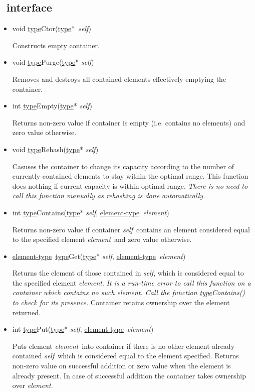 \documentclass[a4paper]{article}
\newcommand{\st}{\underline{type}}
\newcommand{\et}{\underline{element-type}}
\newcommand{\sv}{\emph{self}}
\newcommand{\ev}{\emph{element}}
\newcommand{\meth}[1]{#1}
\begin{document}
\subsection{\Hashset\ interface}


\begin{itemize}


\item \meth{void \st Ctor(\st*\ \sv)}


Constructs empty container.


\commonmethods


\item \meth{void \st Purge}(\st* \sv)


Removes and destroys all contained elements effectively emptying the container.


\item \meth{int \st Empty}(\st* \sv)


Returns non-zero value if container is empty (i.e. contains no elements) and zero value otherwise.


\item \meth{void \st Rehash(\st* \sv)}


Casuses the container to change its capacity according to the number of currently contained elements to stay within the optimal range.
This function does nothing if current capacity is within optimal range.
\emph{There is no need to call this function manually as rehashing is done automatically.}


\item \meth{int \st Contains(\st* \sv, \et\ \ev)}


Returns non-zero value if container \sv\ contains an element considered equal to the specified element \ev\ and zero value otherwise.


\item \meth{\et\ \st Get(\st* \sv, \et\ \ev)}


Returns the element of those contained in \sv, which is considered equal to the specified element \ev.
\emph{It is a run-time error to call this function on a container which contains no such element. Call the function \meth{\st Contains()} to check for its presence.}
Container retains ownership over the element returned.


\item \meth{int \st Put(\st* \sv, \et\ \ev)}


Puts element \ev\ into container if there is no other element already contained \sv\ which is considered equal to the element specified.
Returns non-zero value on successful addition or zero value when the element is already present.
In case of successful addition the container takes ownership over \ev.



\end{itemize}
\end{document}
